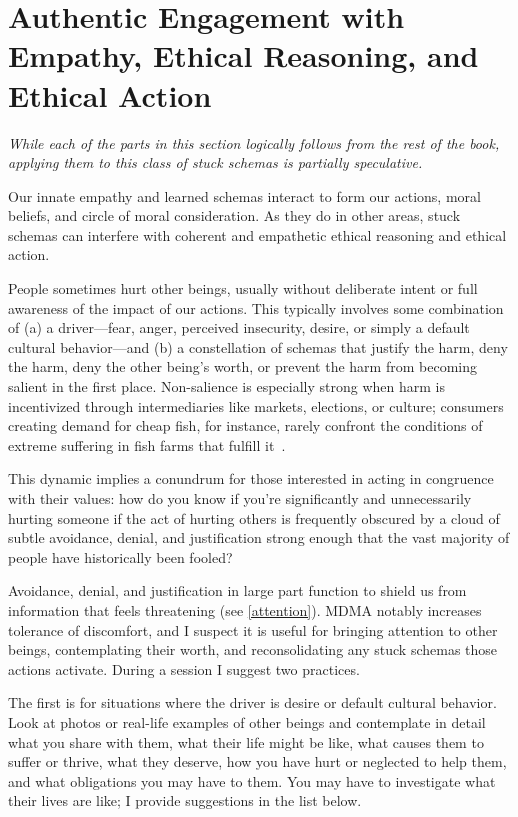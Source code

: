 \documentclass[11pt,oneside]{book}
\let\cite\parencite
\begin{document}
\section{Authentic Engagement with Empathy, Ethical Reasoning, and Ethical Action}
\label{stopcycle}
\textit{While each of the parts in this section logically follows from the rest of the book, applying them to this class of stuck schemas is partially speculative.}

Our innate empathy and learned schemas interact to form our actions, moral beliefs, and circle of moral consideration. As they do in other areas, stuck schemas can interfere with coherent and empathetic ethical reasoning and ethical action.

People sometimes hurt other beings, usually without deliberate intent or full awareness of the impact of our actions. This typically involves some combination of (a) a driver---fear, anger, perceived insecurity, desire, or simply a default cultural behavior---and (b) a constellation of schemas that justify the harm, deny the harm, deny the other being's worth, or prevent the harm from becoming salient in the first place. Non-salience is especially strong when harm is incentivized through intermediaries like markets, elections, or culture; consumers creating demand for cheap fish, for instance, rarely confront the conditions of extreme suffering in fish farms that fulfill it~\cite{singerLiberation}.

This dynamic implies a conundrum for those interested in acting in congruence with their values: how do you know if you're significantly and unnecessarily hurting someone if the act of hurting others is frequently obscured by a cloud of subtle avoidance, denial, and justification strong enough that the vast majority of people have historically been fooled?

Avoidance, denial, and justification in large part function to shield us from information that feels threatening (see \cref{attention}). MDMA notably increases tolerance of discomfort, and I suspect it is useful for bringing attention to other beings, contemplating their worth, and reconsolidating any stuck schemas those actions activate. During a session I suggest two practices.

The first is for situations where the driver is desire or default cultural behavior. Look at photos or real-life examples of other beings and contemplate in detail what you share with them, what their life might be like, what causes them to suffer or thrive, what they deserve, how you have hurt or neglected to help them, and what obligations you may have to them. You may have to investigate what their lives are like; I provide suggestions in the list below.
\end{document}
